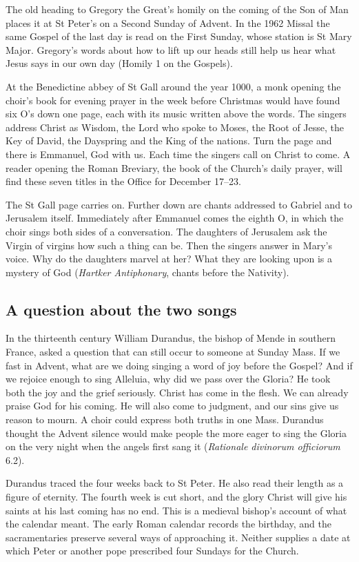 The old heading to Gregory the Great's homily on the coming of the Son of
Man places it at St Peter's on a Second Sunday of Advent. In the 1962 Missal
the same Gospel of the last day is read on the First Sunday, whose station
is St Mary Major. Gregory's words about how to lift up our heads still help
us hear what Jesus says in our own day (Homily 1 on the Gospels).

At the Benedictine abbey of St Gall around the year 1000, a monk opening
the choir's book for evening prayer in the week before Christmas would
have found six O's down one page, each with its music written above
the words. The singers address Christ as Wisdom, the
Lord who spoke to Moses, the Root of Jesse, the Key of David, the
Dayspring and the King of the nations. Turn the page and there is
Emmanuel, God with us. Each time the singers call on Christ to
come. A reader opening the Roman Breviary, the book of the Church's daily
prayer, will find these seven titles in the Office for December 17--23.

The St Gall page carries on. Further down are chants addressed to
Gabriel and to Jerusalem itself. Immediately after Emmanuel comes the
eighth O, in which the choir sings both sides of a conversation. The
daughters of Jerusalem ask the Virgin of virgins how such a thing can be.
Then the singers answer in Mary's voice. Why do the daughters marvel at her? What they
are looking upon is a mystery of God (\emph{Hartker Antiphonary}, chants
before the Nativity).

\subsection{A question about the two songs}

In the thirteenth century William Durandus, the bishop of Mende in
southern France, asked a question that can still occur to someone at
Sunday Mass. If we fast in Advent, what are we doing singing a word of
joy before the Gospel? And if we rejoice enough to sing Alleluia, why
did we pass over the Gloria? He took both the joy and the grief
seriously. Christ has come in the flesh. We can already praise God for
his coming. He will also come to judgment, and our sins give us reason
to mourn. A choir could express both truths in one Mass. Durandus
thought the Advent silence would make people the more eager to sing the
Gloria on the very night when the angels first sang it
(\emph{Rationale divinorum officiorum} 6.2).

Durandus traced the four weeks back to St Peter. He also read their
length as a figure of eternity. The fourth week is cut short, and the
glory Christ will give his saints at his last coming has no end.
This is a medieval bishop's account of what the calendar meant. The
early Roman calendar records the birthday, and the sacramentaries
preserve several ways of approaching it. Neither supplies a date at
which Peter or another pope prescribed four Sundays for the Church.

